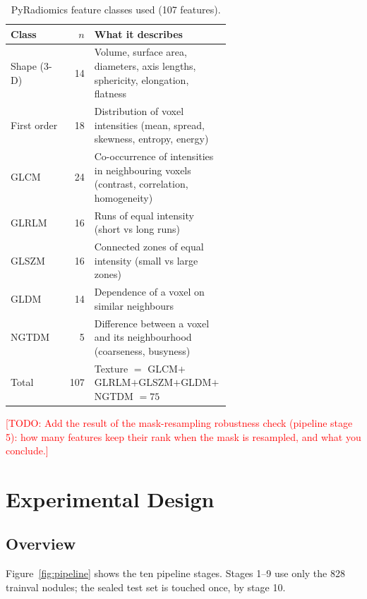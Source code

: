 \documentclass[journal]{IEEEtran}
\newcommand{\TODO}[1]{\textcolor{red}{[TODO: #1]}}
\begin{document}
\begin{table}[!t]
\caption{PyRadiomics feature classes used (107 features).}
\label{tab:features}
\centering\small
\begin{tabular}{lrp{0.62\linewidth}}
\toprule
Class & $n$ & What it describes\\
\midrule
Shape (3-D)     & 14 & Volume, surface area, diameters, axis lengths, sphericity, elongation, flatness\\
First order     & 18 & Distribution of voxel intensities (mean, spread, skewness, entropy, energy)\\
GLCM            & 24 & Co-occurrence of intensities in neighbouring voxels (contrast, correlation, homogeneity)\\
GLRLM           & 16 & Runs of equal intensity (short vs long runs)\\
GLSZM           & 16 & Connected zones of equal intensity (small vs large zones)\\
GLDM            & 14 & Dependence of a voxel on similar neighbours\\
NGTDM           &  5 & Difference between a voxel and its neighbourhood (coarseness, busyness)\\
\midrule
Total           & 107 & Texture $=$ GLCM$+$GLRLM$+$GLSZM$+$GLDM$+$NGTDM $=75$\\
\bottomrule
\end{tabular}
\end{table}

\TODO{Add the result of the mask-resampling robustness check (pipeline stage 5): how many features keep
their rank when the mask is resampled, and what you conclude.}

\section{Experimental Design}
\label{sec:design}

\subsection{Overview}
Figure~\ref{fig:pipeline} shows the ten pipeline stages. Stages 1--9 use only the 828 trainval nodules;
the sealed test set is touched once, by stage 10.
\end{document}
